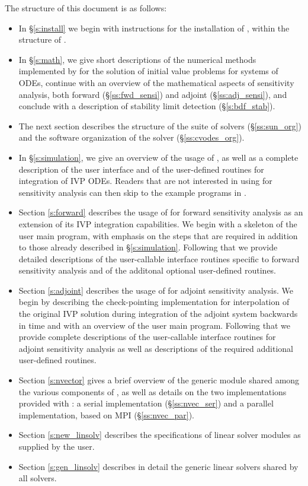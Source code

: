 The structure of this document is as follows:
\begin{itemize}
\item
  In \S\ref{s:install} we begin with instructions for the installation of 
  {\cvodes}, within the structure of {\sundials}.
\item
  In \S\ref{s:math}, we give short descriptions of the numerical 
  methods implemented by {\cvodes} for the solution of initial value problems
  for systems of ODEs, continue with an overview of the mathematical aspects 
  of sensitivity analysis, both forward (\S\ref{ss:fwd_sensi}) and adjoint
  (\S\ref{ss:adj_sensi}), and conclude with a description of stability limit
  detection (\S\ref{s:bdf_stab}).
\item
  The next section describes the structure of the {\sundials} suite
  of solvers (\S\ref{ss:sun_org}) and the software organization of the {\cvodes}
  solver (\S\ref{ss:cvodes_org}). 
\item
  In \S\ref{s:simulation}, we give an overview of the usage of {\cvodes},
  as well as a complete description of the user interface and of the 
  user-defined routines for integration of IVP ODEs. Readers that are not 
  interested in using {\cvodes} for sensitivity analysis can then 
  skip to the example programs in \cite{cvodes1.1_ex}.
\item
  Section \ref{s:forward} describes the usage of {\cvodes} for forward
  sensitivity analysis as an extension of its IVP integration capabilities. 
  We begin with a skeleton of the user main program, with emphasis on the 
  steps that are required in addition to those already described in \S\ref{s:simulation}.
  Following that we provide detailed descriptions of the user-callable interface routines 
  specific to forward sensitivity analysis and of the additonal optional user-defined
  routines.
\item
  Section \ref{s:adjoint} describes the usage of {\cvodes} for adjoint
  sensitivity analysis. We begin by describing the {\cvodes} check-pointing 
  implementation for interpolation of the original IVP solution during
  integration of the adjoint system backwards in time and with 
  an overview of the user main program. Following that we provide complete
  descriptions of the user-callable interface routines for adjoint sensitivity
  analysis as well as descriptions of the required additional user-defined routines.
\item
  Section \ref{s:nvector} gives a brief overview of the generic {\nvector} module 
  shared among the various components of {\sundials}, as well as details on the two {\nvector}
  implementations provided with {\sundials}: a serial implementation
  (\S\ref{ss:nvec_ser}) and a parallel implementation, based on MPI
  (\S\ref{ss:nvec_par}).
\item
  Section \ref{s:new_linsolv} describes the specifications of linear solver modules as 
  supplied by the user.
\item
  Section \ref{s:gen_linsolv} describes in detail the generic linear solvers shared 
  by all {\sundials} solvers.
\end{itemize}

